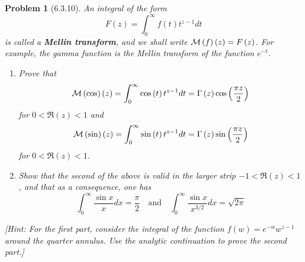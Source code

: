 \documentclass[10pt]{article}
\newcommand{\sk}{\vskip 6mm}
\theoremstyle{plain}
\newtheorem{problem}{Problem}
\theoremstyle{remark}
\begin{document}
\sk

\begin{problem}[6.3.10]
  An integral of the form
  \[
    F\left(z\right)=\int_0^\infty f\left(t\right)t^{z-1}dt
  \]
  is called a \textbf{Mellin transform}, and we shall write
  ${\cal M}\left(f\right)\left(z\right)=F\left(z\right)$. For example, the gamma function is the Mellin
  transform of the function $e^{-t}$.
  \begin{enumerate}
  \item[(a)] Prove that
    \[
      {\cal M}\left(\cos\right)\left(z\right)=\int_0^\infty\cos\left(t\right)t^{z-1}dt=\Gamma\left(z\right)\cos\left(\frac{\pi z}{2}\right)
    \]
    for $0<\Re\left(z\right)<1$ and
    \[
      {\cal M}\left(\sin\right)\left(z\right)=\int_0^\infty\sin\left(t\right)t^{z-1}dt=\Gamma\left(z\right)\sin\left(\frac{\pi z}{2}\right)
    \]
    for $0<\Re\left(z\right)<1$.
  \item[(b)] Show that the second of the above is valid in the larger strip
    $-1<\Re\left(z\right)<1$, and that as a consequence, one has
    \[
      \int_0^\infty \frac{\sin x}{x}dx=\frac{\pi}{2}\quad \text{and}\quad \int_0^\infty\frac{\sin x}{x^{3/2}}dx=\sqrt{2\pi}
    \]
  \end{enumerate}
  [Hint: For the first part, consider the integral of the function
  $f\left(w\right)=e^{-w}w^{z-1}$ around the quarter annulus. Use the analytic continuation
  to prove the second part.]
\end{problem}
\end{document}
